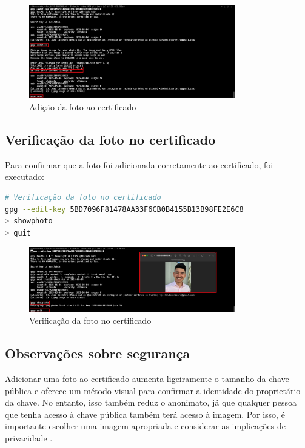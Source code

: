 \begin{figure}[htb]
    \centering
    \includegraphics[width=0.8\textwidth]{images/08-adicao_foto_certificado.jpeg}
    \caption{Adição da foto ao certificado}
    \label{fig:adicao-foto}
\end{figure}

\subsection{Verificação da foto no certificado}
Para confirmar que a foto foi adicionada corretamente ao certificado, foi executado:

\begin{lstlisting}[language=bash]
# Verificação da foto no certificado
gpg --edit-key 5BD7096F81478AA33F6CB0B4155B13B98FE2E6C8
> showphoto
> quit
\end{lstlisting}

\begin{figure}[htb]
    \centering
    \includegraphics[width=0.8\textwidth]{images/08-verificacao_foto_certificado.jpeg}
    \caption{Verificação da foto no certificado}
    \label{fig:verificacao-foto}
\end{figure}

\subsection{Observações sobre segurança}
Adicionar uma foto ao certificado aumenta ligeiramente o tamanho da chave pública e oferece um método visual para confirmar a identidade do proprietário da chave. No entanto, isso também reduz o anonimato, já que qualquer pessoa que tenha acesso à chave pública também terá acesso à imagem. Por isso, é importante escolher uma imagem apropriada e considerar as implicações de privacidade \cite{pgpbest}.

